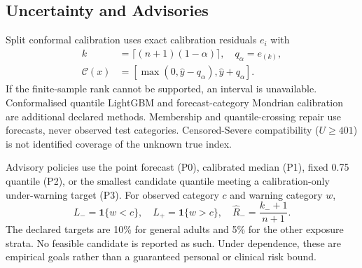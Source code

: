 \subsection{Uncertainty and Advisories}
Split conformal calibration uses exact calibration residuals $e_i$ with
\begin{equation}
\begin{aligned}
k&=\lceil(n+1)(1-\alpha)\rceil,\quad q_\alpha=e_{(k)},\\
\mathcal C(x)&=[\max(0,\widehat y-q_\alpha),\widehat y+q_\alpha].
\end{aligned}
\label{eq:conformal}
\end{equation}
If the finite-sample rank cannot be supported, an interval is unavailable.
Conformalised quantile LightGBM and forecast-category Mondrian calibration
are additional declared methods. Membership and quantile-crossing repair use
forecasts, never observed test categories. Censored-Severe compatibility
($U\geq401$) is not identified coverage of the unknown true index.

Advisory policies use the point forecast (P0), calibrated median (P1), fixed
0.75 quantile (P2), or the smallest candidate quantile meeting a calibration-only
under-warning target (P3). For observed category $c$ and warning category $w$,
\begin{equation}
L_-=\mathbf1\{w<c\},\quad L_+=\mathbf1\{w>c\},\quad
\widehat R_-=\frac{k_-+1}{n+1}.\label{eq:warning}
\end{equation}
The declared targets are 10\% for general adults and 5\% for the other exposure
strata. No feasible candidate is reported as such. Under dependence, these
are empirical goals rather than a guaranteed personal or clinical risk bound.
